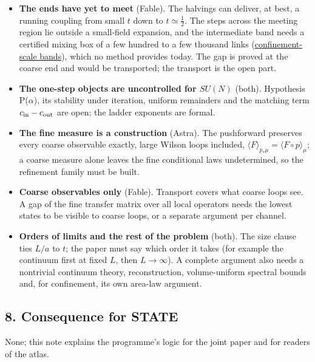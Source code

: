 \documentclass[11pt,a4paper]{article}
\newcommand{\tightlist}{\setlength{\itemsep}{0pt}\setlength{\parskip}{0pt}}
\begin{document}
\begin{itemize}
\tightlist
\item
  \textbf{The ends have yet to meet} (Fable). The halvings can deliver,
  at best, a running coupling from small \(t\) down to
  \(t\simeq\frac12\). The steps across the meeting region lie outside a
  small-field expansion, and the intermediate band needs a certified
  mixing box of a few hundred to a few thousand links
  (\href{confinement-scale-bands.md}{confinement-scale bands}), which no
  method provides today. The gap is proved at the coarse end and would
  be transported; the transport is the open part.
\item
  \textbf{The one-step objects are uncontrolled for \(SU(N)\)} (both).
  Hypothesis P(\(\alpha\)), its stability under iteration, uniform
  remainders and the matching term \(c_{\rm in}-c_{\rm out}\) are open;
  the ladder exponents are formal.
\item
  \textbf{The fine measure is a construction} (Astra). The pushforward
  preserves every coarse observable exactly, large Wilson loops
  included, \(\langle F\rangle_{p_*\mu}=\langle F\circ p\rangle_\mu\); a
  coarse measure alone leaves the fine conditional laws undetermined, so
  the refinement family must be built.
\item
  \textbf{Coarse observables only} (Fable). Transport covers what coarse
  loops see. A gap of the fine transfer matrix over all local operators
  needs the lowest states to be visible to coarse loops, or a separate
  argument per channel.
\item
  \textbf{Orders of limits and the rest of the problem} (both). The size
  clause ties \(L/a\) to \(t\); the paper must say which order it takes
  (for example the continuum first at fixed \(L\), then \(L\to\infty\)).
  A complete argument also needs a nontrivial continuum theory,
  reconstruction, volume-uniform spectral bounds and, for confinement,
  its own area-law argument.
\end{itemize}

\hypertarget{consequence-for-state}{%
\subsection{8. Consequence for STATE}\label{consequence-for-state}}

None; this note explains the programme's logic for the joint paper and
for readers of the atlas.
\end{document}
